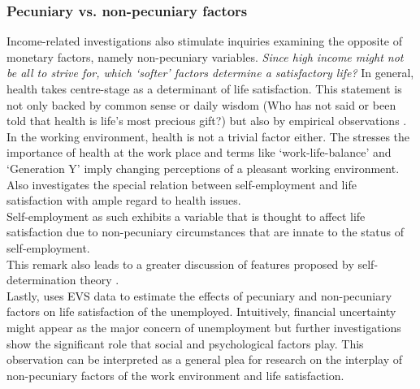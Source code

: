\documentclass[preprint,12pt,authoryear]{elsarticle}
\begin{document}
\subsubsection{Pecuniary vs. non-pecuniary factors}
Income-related investigations also stimulate inquiries examining the opposite of monetary factors, namely non-pecuniary
variables. \textit{Since high income might not be all to strive for, which `softer' factors determine a satisfactory life?}
In general, health takes centre-stage as a determinant of life satisfaction. This statement is not only backed by common 
sense or daily wisdom (Who has not said or been told that health is life's most precious gift?) but also by empirical observations \citep{pedersen_happiness_2011}. \\
In the working environment, health is not a trivial factor either. The \citet{who_global_1994} stresses the importance of health at the work place and terms like `work-life-balance' and `Generation Y' imply changing perceptions of a pleasant working environment. Also \citet{andersson_happiness_2008}
investigates the special relation between self-employment and life satisfaction with ample regard to health issues. \\
Self-employment as such exhibits a variable that is thought to affect life satisfaction \citep{andersson_happiness_2008,schneck_why_2014,van_der_zwan_self-employment_2018}
due to non-pecuniary circumstances that are innate to the status of self-employment. \\
This remark also leads to a greater discussion of features proposed by self-determination theory \citep{deci_intrinsic_1985,deci_self-determination_1989,ryan_self-determination_2000}. \\
Lastly, \citet{luo_essays_2018} uses EVS data to estimate the effects of pecuniary and non-pecuniary factors on life satisfaction
of the unemployed. Intuitively, financial uncertainty might appear as the major concern of unemployment but further investigations
show the significant role that social and psychological factors play. This observation can be interpreted as a general plea for research on
the interplay of non-pecuniary factors of the work environment and life satisfaction. 
\end{document}
